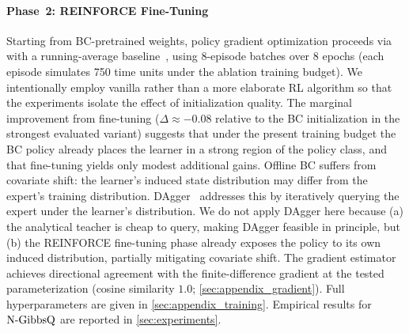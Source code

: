\paragraph{Phase~2: REINFORCE Fine-Tuning}
Starting from BC-pretrained weights, policy gradient optimization proceeds via \reinforce{} with a running-average baseline~\cite{williams1992simple}, using 8-episode batches over 8 epochs (each episode simulates 750 time units under the ablation training budget).
We intentionally employ vanilla \reinforce{} rather than a more elaborate RL algorithm so that the experiments isolate the effect of initialization quality.
The marginal improvement from \reinforce{} fine-tuning ($\Delta \approx -0.08$ relative to the BC initialization in the strongest evaluated variant) suggests that under the present training budget the BC policy already places the learner in a strong region of the policy class, and that fine-tuning yields only modest additional gains.
Offline BC suffers from covariate shift: the learner's induced state distribution may differ from the expert's training distribution. DAgger~\cite{ross2011reduction} addresses this by iteratively querying the expert under the learner's distribution. We do not apply DAgger here because (a) the analytical teacher is cheap to query, making DAgger feasible in principle, but (b) the REINFORCE fine-tuning phase already exposes the policy to its own induced distribution, partially mitigating covariate shift.
The gradient estimator achieves directional agreement with the finite-difference gradient at the tested parameterization (cosine similarity $1.0$; \cref{sec:appendix_gradient}).
Full hyperparameters are given in \cref{sec:appendix_training}.
Empirical results for $\text{N-GibbsQ}$ are reported in \cref{sec:experiments}.
